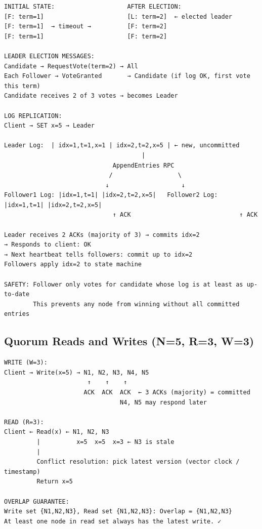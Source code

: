 \documentclass[11pt]{article}
\begin{document}
\setcodelang{}

\begin{verbatim}
INITIAL STATE:                    AFTER ELECTION:
[F: term=1]                       [L: term=2]  ← elected leader
[F: term=1]  → timeout →          [F: term=2]
[F: term=1]                       [F: term=2]

LEADER ELECTION MESSAGES:
Candidate → RequestVote(term=2) → All
Each Follower → VoteGranted       → Candidate (if log OK, first vote this term)
Candidate receives 2 of 3 votes → becomes Leader

LOG REPLICATION:
Client → SET x=5 → Leader

Leader Log:  | idx=1,t=1,x=1 | idx=2,t=2,x=5 | ← new, uncommitted
                                      |
                              AppendEntries RPC
                             /                  \
                            ↓                    ↓
Follower1 Log: |idx=1,t=1| |idx=2,t=2,x=5|   Follower2 Log: |idx=1,t=1| |idx=2,t=2,x=5|
                              ↑ ACK                              ↑ ACK

Leader receives 2 ACKs (majority of 3) → commits idx=2
→ Responds to client: OK
→ Next heartbeat tells followers: commit up to idx=2
Followers apply idx=2 to state machine

SAFETY: Follower only votes for candidate whose log is at least as up-to-date
        This prevents any node from winning without all committed entries
\end{verbatim}

\subsection{Quorum Reads and Writes (N=5, R=3, W=3)}\label{quorum-reads-and-writes-n5-r3-w3}

\setcodelang{}

\begin{verbatim}
WRITE (W=3):
Client → Write(x=5) → N1, N2, N3, N4, N5
                       ↑    ↑    ↑
                      ACK  ACK  ACK  ← 3 ACKs (majority) = committed
                                N4, N5 may respond later

READ (R=3):
Client ← Read(x) ← N1, N2, N3
         |          x=5  x=5  x=3 ← N3 is stale
         |
         Conflict resolution: pick latest version (vector clock / timestamp)
         Return x=5

OVERLAP GUARANTEE:
Write set {N1,N2,N3}, Read set {N1,N2,N3}: Overlap = {N1,N2,N3}
At least one node in read set always has the latest write. ✓
\end{verbatim}
\end{document}
